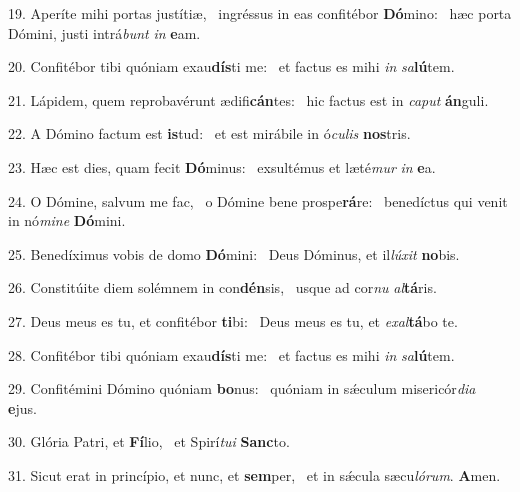 19. Aperíte mihi portas justítiæ, \dag\  ingréssus in eas confitébor \textbf{Dó}mino: \ast\  hæc porta Dómini, justi intrá\textit{bunt} \textit{in} \textbf{e}am.\

20. Confitébor tibi quóniam exau\textbf{dís}ti me: \ast\  et factus es mihi \textit{in} \textit{sa}\textbf{lú}tem.\

21. Lápidem, quem reprobavérunt ædifi\textbf{cán}tes: \ast\  hic factus est in \textit{ca}\textit{put} \textbf{án}guli.\

22. A Dómino factum est \textbf{is}tud: \ast\  et est mirábile in ó\textit{cu}\textit{lis} \textbf{nos}tris.\

23. Hæc est dies, quam fecit \textbf{Dó}minus: \ast\  exsultémus et læté\textit{mur} \textit{in} \textbf{e}a.\

24. O Dómine, salvum me fac, \dag\  o Dómine bene prospe\textbf{rá}re: \ast\  benedíctus qui venit in nó\textit{mi}\textit{ne} \textbf{Dó}mini.\

25. Benedíximus vobis de domo \textbf{Dó}mini: \ast\  Deus Dóminus, et il\textit{lú}\textit{xit} \textbf{no}bis.\

26. Constitúite diem solémnem in con\textbf{dén}sis, \ast\  usque ad cor\textit{nu} \textit{al}\textbf{tá}ris.\

27. Deus meus es tu, et confitébor \textbf{ti}bi: \ast\  Deus meus es tu, et \textit{ex}\textit{al}\textbf{tá}bo te.\

28. Confitébor tibi quóniam exau\textbf{dís}ti me: \ast\  et factus es mihi \textit{in} \textit{sa}\textbf{lú}tem.\

29. Confitémini Dómino quóniam \textbf{bo}nus: \ast\  quóniam in sǽculum misericór\textit{di}\textit{a} \textbf{e}jus.\

30. Glória Patri, et \textbf{Fí}lio, \ast\  et Spirí\textit{tu}\textit{i} \textbf{Sanc}to.\

31. Sicut erat in princípio, et nunc, et \textbf{sem}per, \ast\  et in sǽcula sæcu\textit{ló}\textit{rum}. \textbf{A}men.\

